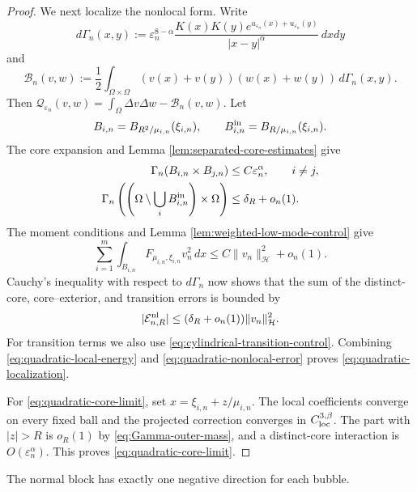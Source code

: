 \documentclass[11pt]{article}
\numberwithin{equation}{section}
\begin{document}
\begin{proof}
We next localize the nonlocal form. Write
\[
d\Gamma_n(x,y)
:=\varepsilon_n^{8-\alpha}
\frac{K(x)K(y)e^{u_{\varepsilon_n}(x)+u_{\varepsilon_n}(y)}}
{|x-y|^\alpha}\,dxdy
\]
and
\[
\mathcal B_n(v,w)
:=\frac12\int_{\Omega\times\Omega}
(v(x)+v(y))(w(x)+w(y))\,d\Gamma_n(x,y).
\]
Then
$\mathcal Q_{\varepsilon_n}(v,w)
=\int_\Omega\Delta v\Delta w-\mathcal B_n(v,w)$. Let
\[
B_{i,n}=B_{R^2/\mu_{i,n}}(\xi_{i,n}),
\qquad
B_{i,n}^{\rm in}=B_{R/\mu_{i,n}}(\xi_{i,n}).
\]
The core expansion and Lemma
\ref{lem:separated-core-estimates} give
\begin{align}
\Gamma_n(B_{i,n}\times B_{j,n})
&\leq C\varepsilon_n^\alpha,
\qquad i\ne j,
\notag\\
\Gamma_n\left(
\left(\Omega\setminus\bigcup_iB_{i,n}^{\rm in}\right)
\times\Omega\right)
&\leq\delta_R+o_n(1).
\label{eq:Gamma-outer-mass}
\end{align}
The moment conditions and Lemma
\ref{lem:weighted-low-mode-control} give
\begin{equation*}
\sum_{i=1}^m
\int_{B_{i,n}}F_{\mu_{i,n},\xi_{i,n}}v_n^2\,dx
\leq C\|v_n\|_{\mathcal H}^2+o_n(1).
\end{equation*}
Cauchy's inequality with respect to $d\Gamma_n$ now shows that the
sum of the distinct-core, core--exterior, and transition errors is
bounded by
\begin{equation}\label{eq:quadratic-nonlocal-error}
|\mathcal E_{n,R}^{\rm nl}|
\leq(\delta_R+o_n(1))\|v_n\|_{\mathcal H}^2.
\end{equation}
For transition terms we also use
\eqref{eq:cylindrical-transition-control}. Combining
\eqref{eq:quadratic-local-energy} and
\eqref{eq:quadratic-nonlocal-error} proves
\eqref{eq:quadratic-localization}.

For \eqref{eq:quadratic-core-limit}, set
$x=\xi_{i,n}+z/\mu_{i,n}$. The local coefficients converge on every
fixed ball and the projected correction converges in
$C^{3,\beta}_{\rm loc}$. The part with $|z|>R$ is $o_R(1)$ by
\eqref{eq:Gamma-outer-mass}, and a distinct-core interaction is
$O(\varepsilon_n^\alpha)$. This proves
\eqref{eq:quadratic-core-limit}.
\end{proof}

The normal block has exactly one negative direction for each bubble.
\end{document}
